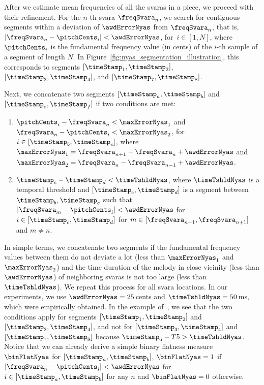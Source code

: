 {After we estimate mean frequencies of all the \glspl{svara} in a piece, we proceed with their refinement. For the $n$-th \gls{svara} $\freqSvara_n$, we search for contiguous segments within a deviation of $\awdErrorNyas$ from $\freqSvara_n$, that is, $\vert \freqSvara_n-\pitchCents_i \vert < \awdErrorNyas$, for~$i\in[1,N]$, where $\pitchCents_i$ is the fundamental frequency value (in cents) of the $i$-th sample of a segment of length $N$. In Figure~\ref{fig:nyas_segmentation_illustration}, this corresponds to segments $[\timeStamp_1,\timeStamp_2]$, $[\timeStamp_3,\timeStamp_4]$, and $[\timeStamp_7,\timeStamp_8]$.

Next, we concatenate two segments $[\timeStamp_a,\timeStamp_b]$ and $[\timeStamp_e,\timeStamp_f]$ if two conditions are met:
\begin{enumerate}
	\item $\pitchCents_i-\freqSvara_n < \maxErrorNyas_1$ and $\freqSvara_n-\pitchCents_i < \maxErrorNyas_2$, for $i\in[\timeStamp_b,\timeStamp_e]$, where $\maxErrorNyas_1 = \freqSvara_{n+1}-\freqSvara_n + \awdErrorNyas$ and $\maxErrorNyas_2 = \freqSvara_n-\freqSvara_{n-1} + \awdErrorNyas$. 
	\item $\timeStamp_c-\timeStamp_d < \timeTshldNyas$, where $\timeTshldNyas$ is a temporal threshold and $[\timeStamp_c,\timeStamp_d]$ is a segment between $\timeStamp_b, \timeStamp_e$ such that $\vert \freqSvara_m-\pitchCents_i\vert <\awdErrorNyas$ for $i\in[\timeStamp_c,\timeStamp_d]$ for $m\in [\freqSvara_{n-1}, \freqSvara_{n+1}]$ and $m \neq n$.
\end{enumerate}

In simple terms, we concatenate two segments if the fundamental frequency values between them do not deviate a lot (less than $\maxErrorNyas_1$ and $\maxErrorNyas_2$) and the time duration of the melody in close vicinity (less than $\awdErrorNyas$) of neighboring \glspl{svara} is not too large (less than $\timeTshldNyas$). We repeat this process for all \gls{svara} locations. In our experiments, we use $\awdErrorNyas = 25$\,cents and $\timeTshldNyas=50$\,ms, which were empirically obtained. In the example of~, we see that the two conditions apply for segments $[\timeStamp_1,\timeStamp_2]$ and $[\timeStamp_3,\timeStamp_4]$, and not for $[\timeStamp_3,\timeStamp_4]$ and $[\timeStamp_7,\timeStamp_8]$ because $\timeStamp_6-T5>\timeTshldNyas$. Notice that we can already derive a simple binary flatness measure $\binFlatNyas$ for $[\timeStamp_a, \timeStamp_b]$, $\binFlatNyas=1$ if $\vert \freqSvara_n-\pitchCents_i \vert< \awdErrorNyas$ for $i \in [\timeStamp_a, \timeStamp_b]$ for any $n$ and $\binFlatNyas=0$ otherwise. 

}
